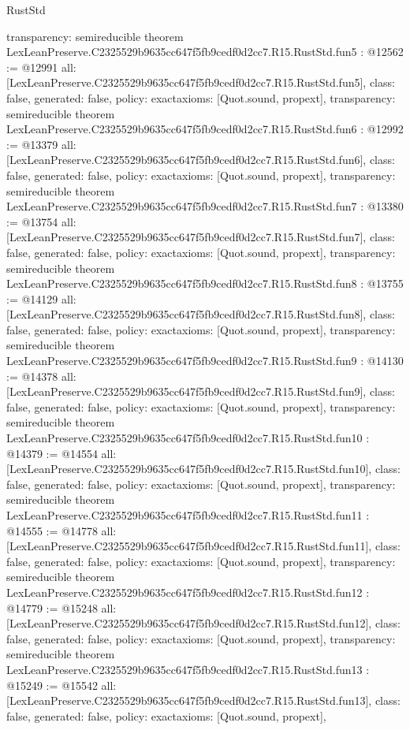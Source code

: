 \begin{lexlean}{RustStd}
\begin{coremodule}
{  transparency: semireducible
}
theorem LexLeanPreserve.C2325529b9635cc647f5fb9cedf0d2cc7.R15.RustStd.fun5 : @12562 := @12991 {
  all: [LexLeanPreserve.C2325529b9635cc647f5fb9cedf0d2cc7.R15.RustStd.fun5],
  class: false,
  generated: false,
  policy: exact{axioms: [Quot.sound, propext]},
  transparency: semireducible
}
theorem LexLeanPreserve.C2325529b9635cc647f5fb9cedf0d2cc7.R15.RustStd.fun6 : @12992 := @13379 {
  all: [LexLeanPreserve.C2325529b9635cc647f5fb9cedf0d2cc7.R15.RustStd.fun6],
  class: false,
  generated: false,
  policy: exact{axioms: [Quot.sound, propext]},
  transparency: semireducible
}
theorem LexLeanPreserve.C2325529b9635cc647f5fb9cedf0d2cc7.R15.RustStd.fun7 : @13380 := @13754 {
  all: [LexLeanPreserve.C2325529b9635cc647f5fb9cedf0d2cc7.R15.RustStd.fun7],
  class: false,
  generated: false,
  policy: exact{axioms: [Quot.sound, propext]},
  transparency: semireducible
}
theorem LexLeanPreserve.C2325529b9635cc647f5fb9cedf0d2cc7.R15.RustStd.fun8 : @13755 := @14129 {
  all: [LexLeanPreserve.C2325529b9635cc647f5fb9cedf0d2cc7.R15.RustStd.fun8],
  class: false,
  generated: false,
  policy: exact{axioms: [Quot.sound, propext]},
  transparency: semireducible
}
theorem LexLeanPreserve.C2325529b9635cc647f5fb9cedf0d2cc7.R15.RustStd.fun9 : @14130 := @14378 {
  all: [LexLeanPreserve.C2325529b9635cc647f5fb9cedf0d2cc7.R15.RustStd.fun9],
  class: false,
  generated: false,
  policy: exact{axioms: [Quot.sound, propext]},
  transparency: semireducible
}
theorem LexLeanPreserve.C2325529b9635cc647f5fb9cedf0d2cc7.R15.RustStd.fun10 : @14379 := @14554 {
  all: [LexLeanPreserve.C2325529b9635cc647f5fb9cedf0d2cc7.R15.RustStd.fun10],
  class: false,
  generated: false,
  policy: exact{axioms: [Quot.sound, propext]},
  transparency: semireducible
}
theorem LexLeanPreserve.C2325529b9635cc647f5fb9cedf0d2cc7.R15.RustStd.fun11 : @14555 := @14778 {
  all: [LexLeanPreserve.C2325529b9635cc647f5fb9cedf0d2cc7.R15.RustStd.fun11],
  class: false,
  generated: false,
  policy: exact{axioms: [Quot.sound, propext]},
  transparency: semireducible
}
theorem LexLeanPreserve.C2325529b9635cc647f5fb9cedf0d2cc7.R15.RustStd.fun12 : @14779 := @15248 {
  all: [LexLeanPreserve.C2325529b9635cc647f5fb9cedf0d2cc7.R15.RustStd.fun12],
  class: false,
  generated: false,
  policy: exact{axioms: [Quot.sound, propext]},
  transparency: semireducible
}
theorem LexLeanPreserve.C2325529b9635cc647f5fb9cedf0d2cc7.R15.RustStd.fun13 : @15249 := @15542 {
  all: [LexLeanPreserve.C2325529b9635cc647f5fb9cedf0d2cc7.R15.RustStd.fun13],
  class: false,
  generated: false,
  policy: exact{axioms: [Quot.sound, propext]},
}
\end{coremodule}
\end{lexlean}
